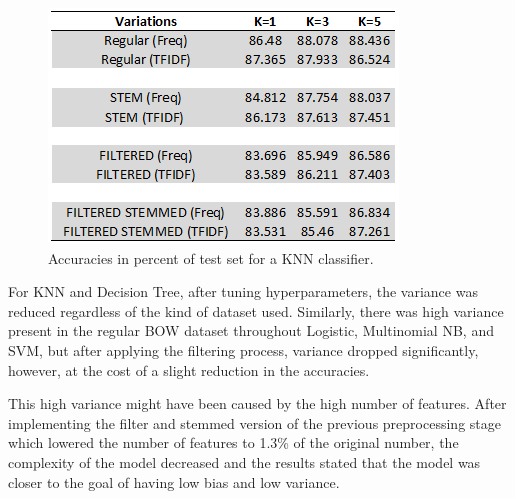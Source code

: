 \documentclass[conference , 11pt]{IEEEtran}
\begin{document}
\begin{figure}[htbp]
\centerline{\includegraphics[width=0.9\columnwidth]{knn-prediction.png}}
\caption{Accuracies in percent of test set for a KNN classifier.}
\label{fig}
\end{figure}
\FloatBarrier
	For KNN and Decision Tree, after tuning hyperparameters, the variance was reduced regardless of the kind of dataset used. Similarly, there was high variance present in the regular BOW dataset throughout Logistic, Multinomial NB, and SVM, but after applying the filtering process, variance dropped significantly, however, at the cost of a slight reduction in the accuracies.

	This high variance might have been caused by the high number of features. After implementing the filter and stemmed version of the previous preprocessing stage  which  lowered the number of features to 1.3\% of the original number, the complexity of the model decreased and the results stated that the model was closer to the goal of having low bias and low variance.
\end{document}
